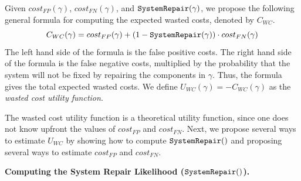 \documentclass[review]{elsarticle}
\newtheorem{definition}{Definition}
\newcommand\sysrep[1]{{\tt SystemRepair(#1)}}
\newcommand{\brps}{\textit{BRP$_S$}}
\newcommand{\brpswc}{\textit{BRP$_S(wc)$}}
\newcommand{\COMPS}{\textit{COMPS}}
\begin{document}
Given $cost_{FP}(\gamma)$, $cost_{FN}(\gamma)$, and $\sysrep{\gamma}$, we propose the following general formula for computing the expected wasted costs, denoted by $C_{WC}$.
\begin{equation}
C_{WC}(\gamma)=cost_{FP}(\gamma)+(1-\sysrep{\gamma})\cdot cost_{FN}(\gamma)
\label{eq:wc}
\end{equation}
The left hand side of the formula is the false positive costs. The right hand side of the formula is the false negative costs, multiplied by the probability that the system will not be fixed by repairing the components in $\gamma$. Thus, the formula gives the total expected wasted costs.
We define $U_{WC}(\gamma)=-C_{WC}(\gamma)$ as the {\em wasted cost utility function}.





The wasted cost utility function is a theoretical utility function, since one does not know upfront the values of $cost_{FP}$ and $cost_{FN}$. Next, we propose several ways to estimate $U_{WC}$ by showing how to compute $\sysrep{}$ and proposing several ways to estimate $cost_{FP}$ and $cost_{FN}$.



\noindent \textbf{Computing the System Repair Likelihood ($\sysrep{}$).}

\end{document}
